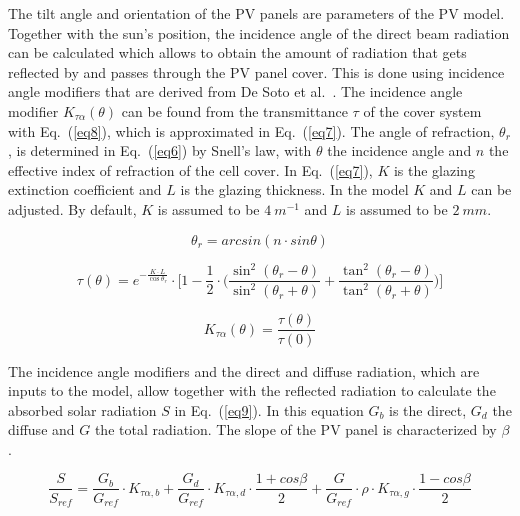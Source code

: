 The tilt angle and orientation of the PV panels are parameters of the PV model. Together with the sun's position, the incidence angle of the direct beam radiation can be calculated which allows to obtain the amount of radiation that gets reflected by and passes through the PV panel cover. This is done using incidence angle modifiers that are derived from De Soto et al.~\cite{desoto}. The incidence angle modifier $K_{\tau \alpha}(\theta)$ can be found from the transmittance $\tau$ of the cover system with Eq.~(\ref{eq8}), which is approximated in Eq.~(\ref{eq7}). The angle of refraction, $\theta _{r}$, is determined in Eq.~(\ref{eq6}) by Snell's law, with $\theta$ the incidence angle and $n$ the effective index of refraction of the cell cover. In Eq.~(\ref{eq7}), $K$ is the glazing extinction coefficient and $L$ is the glazing thickness. In the model $K$ and $L$ can be adjusted. By default, $K$ is assumed to be $4~m^{-1}$ and $L$ is assumed to be $2~mm$.

\begin{equation}
\theta _{r} = arcsin(n \cdot sin \theta)
\label{eq6}
\end{equation}

\begin{dmath}
\tau (\theta) = e^{-\frac{K \cdot L}{\cos \theta _{r}}} \cdot \biggl[1 - \frac{1}{2} \cdot \biggl(\frac{\sin^{2}(\theta _{r} - \theta)}{\sin^{2}(\theta _{r} + \theta)} + \frac{\tan^{2}(\theta _{r} - \theta)}{\tan^{2}(\theta _{r} + \theta)} \biggr) \biggr]
\label{eq7}
\end{dmath}

\begin{equation}
K_{\tau \alpha}(\theta) = \frac{\tau (\theta)}{\tau (0)}
\label{eq8}
\end{equation}

The incidence angle modifiers and the direct and diffuse radiation, which are inputs to the model, allow together with the reflected radiation to calculate the absorbed solar radiation $S$ in Eq.~(\ref{eq9}). In this equation $G_{b}$ is the direct, $G_{d}$ the diffuse and $G$ the total radiation. The slope of the PV panel is characterized by $\beta$.

\begin{dmath}
\frac{S}{S_{ref}} = \frac{G_{b}}{G_{ref}}\cdot K_{\tau \alpha , b} + \frac{G_{d}}{G_{ref}}\cdot K_{\tau \alpha , d}\cdot \frac{1 + cos \beta}{2} + \frac{G}{G_{ref}}\cdot \rho \cdot K_{\tau \alpha , g}\cdot \frac{1 - cos \beta}{2}
\label{eq9}
\end{dmath}

